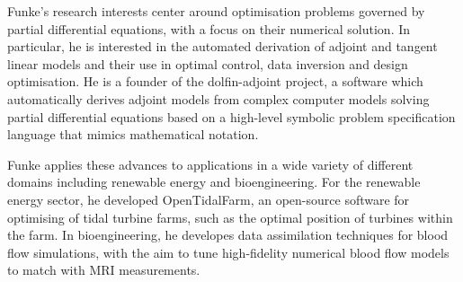 \documentclass[11pt]{article}
\begin{document}

Funke's research interests center around optimisation problems governed by
partial differential equations, with a focus on their numerical solution. In
particular, he is interested in the automated derivation of adjoint and tangent
linear models and their use in optimal control, data inversion and design optimisation.
He is a founder of the dolfin-adjoint project, a software which automatically
derives adjoint models from complex computer models solving partial
differential equations based on a high-level symbolic problem specification
language that mimics mathematical notation.

Funke applies these advances to applications in a wide variety of different
domains including renewable energy and bioengineering. For the renewable energy
sector, he developed OpenTidalFarm, an open-source software for optimising of
tidal turbine farms, such as the optimal position of turbines within the farm.
In bioengineering, he developes data assimilation techniques for blood flow
simulations, with the aim to tune high-fidelity numerical blood flow models to
match with MRI measurements.
\end{document}
